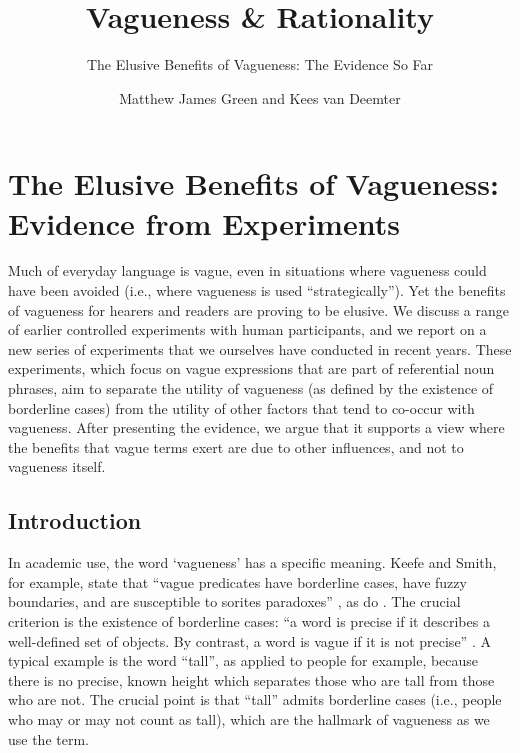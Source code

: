 \documentclass[ %
  graybox       %
 ,envcountchap  %
 ,sectrefs      %
]{svmono}
\begin{document}
\author{Matthew James Green and Kees van Deemter}
\title{Vagueness \& Rationality}
\subtitle{The Elusive Benefits of Vagueness: The Evidence So Far}
\date{}
\maketitle
\frontmatter
\tableofcontents
\mainmatter

\chapter{The Elusive Benefits of Vagueness: Evidence from Experiments}
Much of everyday language is vague, even in situations where vagueness could have been avoided (i.e., where vagueness is used ``strategically'').
Yet the benefits of vagueness for hearers and readers are proving to be elusive.
We discuss a range of earlier controlled experiments with human participants, and we report on a new series of experiments that we ourselves have conducted in recent years.
These experiments, which focus on vague expressions that are part of referential noun phrases, aim to separate the utility of vagueness (as defined by the existence of borderline cases) from the utility of other factors that tend to co-occur with vagueness.
After presenting the evidence, we argue that it supports a view where the benefits that vague terms exert are due to other influences, and not to vagueness itself.

\section{Introduction}
In academic use, the word `vagueness' has a specific meaning.
Keefe and Smith, for example, state that ``vague predicates have borderline cases, have fuzzy boundaries, and are susceptible to sorites paradoxes'' \citep[p.~4]{keefe1997vagueness}, as do \citet{EgreKlinedinst}.
The crucial criterion is the existence of borderline cases: ``a word is precise if it describes a well-defined set of objects. By contrast, a word is vague if it is not precise'' \citet[p.~1]{lipmanvague}.
A typical example is the word ``tall'', as applied to people for example, because there is no precise, known height which separates those who are tall from those who are not.
The crucial point is that ``tall'' admits borderline cases (i.e., people who may or may not count as tall), which are the hallmark of vagueness as we use the term.
\end{document}
